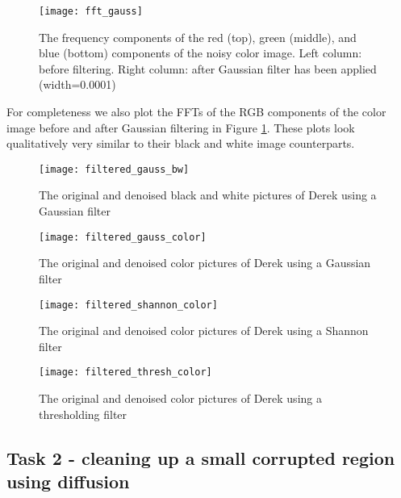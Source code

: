 \documentclass[fleqn,10pt]{../SelfArx} %
\begin{document}
\begin{figure}
\centering
\texttt{[image: fft\_gauss]}
\caption{The frequency components of the red (top), green (middle), and blue (bottom) components of the noisy color image. Left column: before filtering. Right column: after Gaussian filter has been applied (width=0.0001) }
\label{fig:fft_gauss}
\end{figure}

For completeness we also plot the FFTs of the RGB components of the color image before and after Gaussian filtering in Figure \ref{fig:fft_gauss}. These plots look qualitatively very similar to their black and white image counterparts.

\begin{figure}
\centering
\texttt{[image: filtered\_gauss\_bw]}
\caption{The original and denoised black and white pictures of Derek using a Gaussian filter}
\label{fig:filtered_gauss_bw}
\end{figure}
\begin{figure}
\centering
\texttt{[image: filtered\_gauss\_color]}
\caption{The original and denoised color pictures of Derek using a Gaussian filter}
\label{fig:filtered_gauss_color}
\end{figure}
\begin{figure}
\centering
\texttt{[image: filtered\_shannon\_color]}
\caption{The original and denoised color pictures of Derek using a Shannon filter}
\label{fig:filtered_shannon_color}
\end{figure}
\begin{figure}
\centering
\texttt{[image: filtered\_thresh\_color]}
\caption{The original and denoised color pictures of Derek using a thresholding filter}
\label{fig:filtered_thresh_color}
\end{figure}




\subsection{Task 2 - cleaning up a small corrupted region using diffusion}
\end{document}
